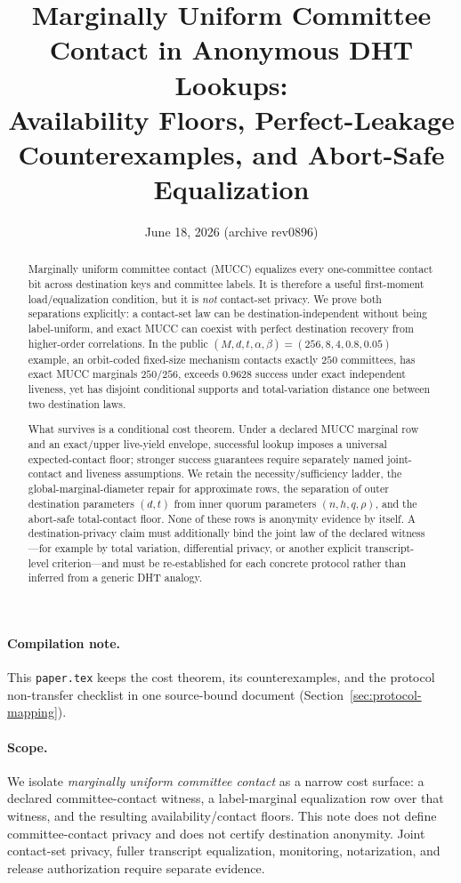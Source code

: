 \documentclass[11pt]{article}
\title{Marginally Uniform Committee Contact in Anonymous DHT Lookups:\\Availability Floors, Perfect-Leakage Counterexamples, and Abort-Safe Equalization}
\author{}
\date{June 18, 2026 (archive rev0896)}
\begin{document}
\maketitle

\begin{abstract}
Marginally uniform committee contact (MUCC) equalizes every one-committee contact bit across destination keys and committee labels.  It is therefore a useful first-moment load/equalization condition, but it is \emph{not} contact-set privacy.  We prove both separations explicitly: a contact-set law can be destination-independent without being label-uniform, and exact MUCC can coexist with perfect destination recovery from higher-order correlations.  In the public $(M,d,t,\alpha,\beta)=(256,8,4,0.8,0.05)$ example, an orbit-coded fixed-size mechanism contacts exactly $250$ committees, has exact MUCC marginals $250/256$, exceeds $0.9628$ success under exact independent liveness, yet has disjoint conditional supports and total-variation distance one between two destination laws.

What survives is a conditional cost theorem.  Under a declared MUCC marginal row and an exact/upper live-yield envelope, successful lookup imposes a universal expected-contact floor; stronger success guarantees require separately named joint-contact and liveness assumptions.  We retain the necessity/sufficiency ladder, the global-marginal-diameter repair for approximate rows, the separation of outer destination parameters $(d,t)$ from inner quorum parameters $(n,h,q,\rho)$, and the abort-safe total-contact floor.  None of these rows is anonymity evidence by itself.  A destination-privacy claim must additionally bind the joint law of the declared witness---for example by total variation, differential privacy, or another explicit transcript-level criterion---and must be re-established for each concrete protocol rather than inferred from a generic DHT analogy.
\end{abstract}

\paragraph{Compilation note.}
This \texttt{paper.tex} keeps the cost theorem, its counterexamples, and the protocol non-transfer checklist in one source-bound document (Section~\ref{sec:protocol-mapping}).


\paragraph{Scope.}
We isolate \emph{marginally uniform committee contact} as a narrow cost surface: a declared committee-contact witness, a label-marginal equalization row over that witness, and the resulting availability/contact floors.  This note does not define committee-contact privacy and does not certify destination anonymity.  Joint contact-set privacy, fuller transcript equalization, monitoring, notarization, and release authorization require separate evidence.
\end{document}

